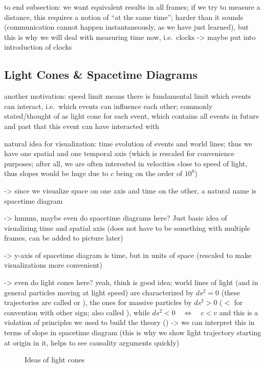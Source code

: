 to end subsection: we want equivalent results in all frames; if we try to measure a distance, this requires a notion of \enquote{at the same time}; harder than it sounds (communication cannot happen instantaneously, as we have just learned), but this is why we will deal with measuring time now, i.e.~clocks -> maybe put into introduction of clocks



		\subsection{Light Cones \& Spacetime Diagrams}
another motivation: speed limit means there is fundamental limit which events can interact, i.e.~which events can influence each other; commonly stated/thought of as light cone for each event, which contains all events in future and past that this event can have interacted with



natural idea for visualization: time evolution of events and world lines; thus we have one spatial and one temporal axis (which is rescaled for convenience purposes; after all, we are often interested in velocities close to speed of light, thus slopes would be huge due to $c$ being on the order of $10^8$)

-> since we visualize space on one axis and time on the other, a natural name is spacetime diagram

-> hmmm, maybe even do spacetime diagrams here? Just basic idea of visualizing time and spatial axis (does not have to be something with multiple frames, can be added to picture later)

-> y-axis of spacetime diagram is time, but in units of space (rescaled to make visualizations more convenient)


-> even do light cones here? yeah, think is good idea; world lines of light (and in general particles moving at light speed) are characterized by $ds^2 = 0$ (these trajectories are called  or ), the ones for massive particles by $ds^2 > 0$ ($<$ for convention with other sign; also called ), while $ds^2 < 0 \quad \Leftrightarrow \quad c < v$ and this is a violation of principles we used to build the theory () -> we can interpret this in terms of slope in spacetime diagram (this is why we show light trajectory starting at origin in it, helps to see causality arguments quickly)


\begin{figure}
\centering


\caption{Ideas of light cones}
\end{figure}



